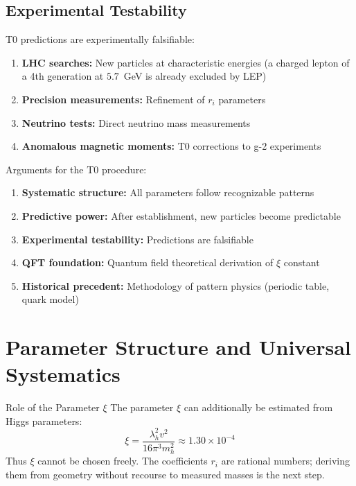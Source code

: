 	\subsection{Experimental Testability}
	\label{subsec:experimental_testability}
	
	T0 predictions are experimentally falsifiable:
	
	\begin{enumerate}
		\item \textbf{LHC searches:} New particles at characteristic energies (a charged lepton of a 4th generation at $5.7$~GeV is already excluded by LEP)
		\item \textbf{Precision measurements:} Refinement of $r_i$ parameters
		\item \textbf{Neutrino tests:} Direct neutrino mass measurements
		\item \textbf{Anomalous magnetic moments:} T0 corrections to g-2 experiments
	\end{enumerate}
	
	Arguments for the T0 procedure:
	
	\begin{enumerate}
		\item \textbf{Systematic structure:} All parameters follow recognizable patterns
		\item \textbf{Predictive power:} After establishment, new particles become predictable
		\item \textbf{Experimental testability:} Predictions are falsifiable
		\item \textbf{QFT foundation:} Quantum field theoretical derivation of $\xi$ constant
		\item \textbf{Historical precedent:} Methodology of pattern physics (periodic table, quark model)
	\end{enumerate}
	
	\section{Parameter Structure and Universal Systematics}
	\label{sec:parameter_free_nature}
	
	\begin{important}{Role of the Parameter $\xi$}{}
		The parameter $\xi$ can additionally be estimated from Higgs parameters:
		\begin{equation}
			\xi = \frac{\lambda_h^2 v^2}{16\pi^3 m_h^2} \approx 1.30 \times 10^{-4}
		\end{equation}
		Thus $\xi$ cannot be chosen freely. The coefficients $r_i$ are rational numbers; deriving them from geometry without recourse to measured masses is the next step.
	\end{important}
	
